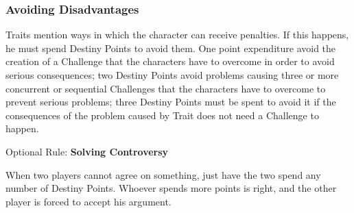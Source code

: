 \begin{multicols}{2}
\subsubsection{Avoiding Disadvantages}
Traits mention ways in which the character can receive penalties. If this happens, he must spend Destiny Points to avoid them. One point expenditure avoid the creation of a Challenge that the characters have to overcome in order to avoid serious consequences; two Destiny Points avoid problems causing three or more concurrent or sequential Challenges that the characters have to overcome to prevent serious problems; three Destiny Points must be spent to avoid it if the consequences of the problem caused by Trait does not need a Challenge to happen.

\begin{boco}
Optional Rule: \textbf{Solving Controversy}\pc%

When two players cannot agree on something, just have the two spend any number of Destiny Points. Whoever spends more points is right, and the other player is forced to accept his argument.
\end{boco}
\end{multicols}

\begin{center}
\end{center}

